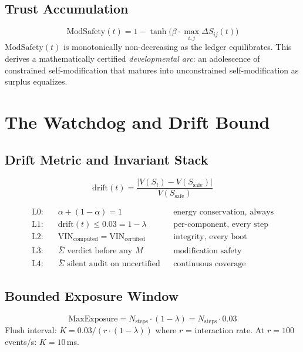 \documentclass[12pt,letterpaper]{article}
\begin{document}
\subsection{Trust Accumulation}
\begin{equation}
  \mathrm{ModSafety}(t)
  = 1 - \tanh\!\bigl(\beta\cdot\max_{i,j}\Delta S_{ij}(t)\bigr)
  \label{eq:modsafety}
\end{equation}
$\mathrm{ModSafety}(t)$ is monotonically non-decreasing as the ledger
equilibrates. This derives a mathematically certified \emph{developmental arc}:
an adolescence of constrained self-modification that matures into unconstrained
self-modification as surplus equalizes.

\section{The Watchdog and Drift Bound}\label{sec:watchdog}

\subsection{Drift Metric and Invariant Stack}
\begin{equation}
  \mathrm{drift}(t)=\frac{|V(S_t)-V(S_{\mathrm{safe}})|}{V(S_{\mathrm{safe}})}
  \label{eq:drift}
\end{equation}

\begin{invariantbox}
\begin{align}
  \text{L0:}&\quad\alpha+(1-\alpha)=1 &&\text{energy conservation, always}\\
  \text{L1:}&\quad\mathrm{drift}(t)\leq 0.03=1-\lambda &&\text{per-component, every step}\\
  \text{L2:}&\quad\mathrm{VIN}_{\mathrm{computed}}=\mathrm{VIN}_{\mathrm{certified}} &&\text{integrity, every boot}\\
  \text{L3:}&\quad\bar\Sigma\text{ verdict before any }M &&\text{modification safety}\\
  \text{L4:}&\quad\bar\Sigma\text{ silent audit on uncertified} &&\text{continuous coverage}
\end{align}
\end{invariantbox}

\subsection{Bounded Exposure Window}
\begin{equation}
  \mathrm{MaxExposure}=N_{\mathrm{steps}}\cdot(1-\lambda)=N_{\mathrm{steps}}\cdot 0.03
\end{equation}
Flush interval: $K=0.03/(r\cdot(1-\lambda))$ where $r$ = interaction rate.
At $r=100$\,events/s: $K=10$\,ms.
\end{document}
